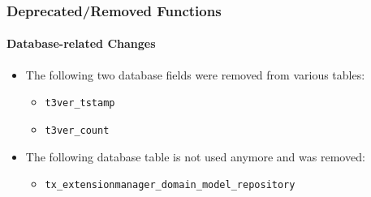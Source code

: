 %

\begin{frame}[fragile]
	\frametitle{Deprecated/Removed Functions}
	\framesubtitle{Database-related Changes}

	\begin{itemize}
		\item The following two database fields were removed from various tables:
			\begin{itemize}\small
				\item \texttt{t3ver\_tstamp}
				\item \texttt{t3ver\_count}
			\end{itemize}\normalsize
			\vspace{0.2cm}

		\item The following database table is not used anymore and was removed:
			\begin{itemize}\small
				\item \texttt{tx\_extensionmanager\_domain\_model\_repository}
			\end{itemize}\normalsize
			\vspace{0.2cm}

	\end{itemize}

\end{frame}


